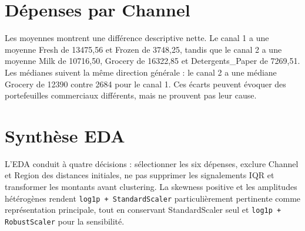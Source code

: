 
\section{Dépenses par Channel}
Les moyennes montrent une différence descriptive nette. Le canal 1 a une moyenne Fresh de 13475,56 et Frozen de 3748,25, tandis que le canal 2 a une moyenne Milk de 10716,50, Grocery de 16322,85 et Detergents\_Paper de 7269,51. Les médianes suivent la même direction générale : le canal 2 a une médiane Grocery de 12390 contre 2684 pour le canal 1. Ces écarts peuvent évoquer des portefeuilles commerciaux différents, mais ne prouvent pas leur cause.


\section{Synthèse EDA}
L'EDA conduit à quatre décisions : sélectionner les six dépenses, exclure Channel et Region des distances initiales, ne pas supprimer les signalements IQR et transformer les montants avant clustering. La skewness positive et les amplitudes hétérogènes rendent \texttt{log1p + StandardScaler} particulièrement pertinente comme représentation principale, tout en conservant StandardScaler seul et \texttt{log1p + RobustScaler} pour la sensibilité.
